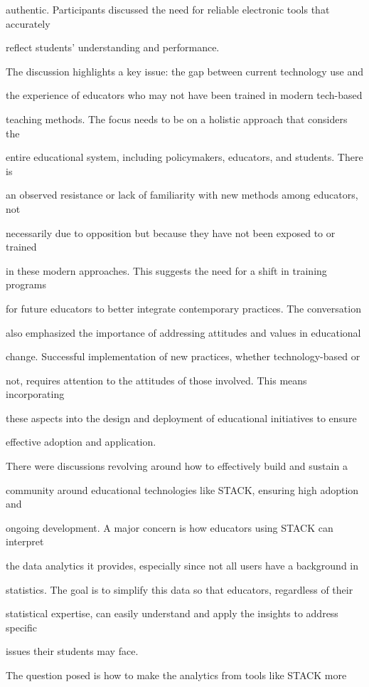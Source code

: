 \documentclass[11pt]{article}
\begin{document}
authentic. Participants discussed the need for reliable electronic tools that accurately

reflect students' understanding and performance.

The discussion highlights a key issue: the gap between current technology use and

the experience of educators who may not have been trained in modern tech-based

teaching methods. The focus needs to be on a holistic approach that considers the

entire educational system, including policymakers, educators, and students. There is

an observed resistance or lack of familiarity with new methods among educators, not

necessarily due to opposition but because they have not been exposed to or trained

in these modern approaches. This suggests the need for a shift in training programs

for future educators to better integrate contemporary practices. The conversation

also emphasized the importance of addressing attitudes and values in educational

change. Successful implementation of new practices, whether technology-based or

not, requires attention to the attitudes of those involved. This means incorporating

these aspects into the design and deployment of educational initiatives to ensure

effective adoption and application.

There were discussions revolving around how to effectively build and sustain a

community around educational technologies like STACK, ensuring high adoption and

ongoing development. A major concern is how educators using STACK can interpret

the data analytics it provides, especially since not all users have a background in

statistics. The goal is to simplify this data so that educators, regardless of their

statistical expertise, can easily understand and apply the insights to address specific

issues their students may face.

The question posed is how to make the analytics from tools like STACK more
\end{document}
